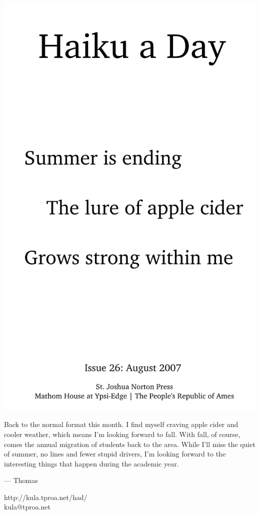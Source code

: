\documentclass[12pt]{article}
\begin{document}
\includegraphics{frontpage.png}

\newpage

Back to the normal format this month. I find myself craving
apple cider and cooler weather, which means I'm looking forward
to fall. With fall, of course, comes the annual migration of
students back to the area. While I'll miss the quiet of summer,
no lines and fewer stupid drivers, I'm looking forward to the
interesting things that happen during the academic year.

--- Thomas

http://kula.tproa.net/had/ \\
kula@tproa.net
\end{document}
